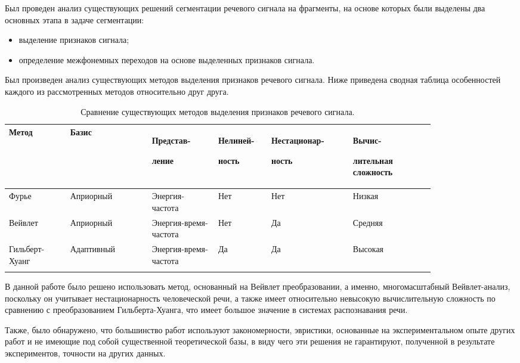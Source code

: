 \documentclass[utf8x, 14pt, oneside, a4paper]{article}
\begin{document}
	Был проведен анализ существующих решений сегментации речевого сигнала на фрагменты, на основе которых были выделены два основных этапа в задаче сегментации:
	
	\begin{itemize}
		\item выделение признаков сигнала;
		\item определение межфонемных переходов на основе выделенных признаков сигнала.
	\end{itemize}

	Был произведен анализ существующих методов выделения признаков речевого сигнала. Ниже приведена сводная таблица особенностей каждого из рассмотренных методов относительно друг друга.
	
	\begin{center}
		\begin{longtable}[h!]{|p{0.12\linewidth}|p{0.16\linewidth}|p{0.13\linewidth}|p{0.1\linewidth}|p{0.16\linewidth}|p{0.16\linewidth}|}
			\hline
			{Метод} & {Базис} & {Представ-
				
				ление} & {Нелиней-
				
				ность} & {Нестационар-
				
				ность} & {Вычис-
				
				лительная сложность}\\
			\hline
			{Фурье} & {Априорный} & {Энергия-частота} & {Нет} & {Нет} & {Низкая}\\
			\hline
			{Вейвлет} & {Априорный} & {Энергия-время-частота} & {Нет} & {Да} & {Средняя}\\
			\hline
			{Гильберт-Хуанг} & {Адаптивный} & {Энергия-время-частота} & {Да} & {Да} & {Высокая}\\
			\hline
			\caption{Сравнение существующих методов выделения признаков речевого сигнала.}
		\end{longtable}
	\end{center}
	
	В данной работе было решено использовать метод, основанный на Вейвлет преобразовании, а именно, многомасштабный Вейвлет-анализ, поскольку он учитывает нестационарность человеческой речи, а также имеет относительно невысокую вычислительную сложность по сравнению с преобразованием Гильберта-Хуанга, что имеет большое значение в системах распознавания речи.
	
	Также, было обнаружено, что большинство работ используют закономерности, эвристики, основанные на экспериментальном опыте других работ и не имеющие под собой существенной теоретической базы, в виду чего эти решения не гарантируют, полученной в результате экспериментов, точности на других данных.
	
\end{document}

